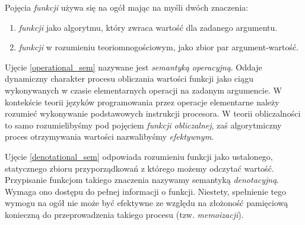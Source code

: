 Pojęcia \emph{funkcji} używa się na ogół mając na myśli dwóch znaczenia:
\begin{enumerate}[label=(\alph*)]
  \setlength\itemsep{0em}
  \item \emph{funkcji} jako algorytmu, który zwraca wartość dla zadanego argumentu.\label{operational_sem}
  \item \emph{funkcji} w rozumieniu teoriomnogościowym, jako zbior par argument-wartość.
\label{denotational_sem}
\end{enumerate}
Ujęcie \ref{operational_sem} nazywane jest \emph{semantyką operacyjną}. Oddaje dynamiczny charakter procesu obliczania wartości funkcji jako ciągu wykonywanych w czasie elementarnych operacji na zadanym argumencie. W kontekście teorii języków programowania przez operacje elementarne należy rozumieć wykonywanie podstawowych instrukcji procesora. W teorii obliczalności to samo rozumielibyśmy pod pojęciem \emph{funkcji obliczalnej}, zaś algorytmiczny proces otrzymywania wartości nazwalibyśmy \emph{efektywnym}.

Ujęcie \ref{denotational_sem} odpowiada rozumieniu funkcji jako ustalonego, statycznego zbioru przyporządkowań z którego możemy odczytać wartość. Przypisanie funkcjom takiego znaczenia nazywamy semantyką \emph{denotacyjną}. Wymaga ono dostępu do pełnej informacji o funkcji. Niestety, spełnienie tego wymogu na ogół nie może być efektywne ze względu na złożoność pamięciową konieczną do przeprowadzenia takiego procesu (tzw. \emph{memoizacji}).


